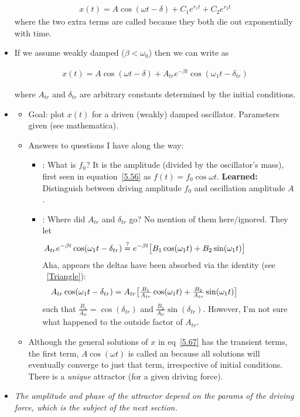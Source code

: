 \documentclass[10pt, twocolumn]{article}
\DeclareRobustCommand{\mybox}[2][gray!20]{%
	\begin{tcolorbox}[   %
		breakable,
		left=0pt,
		right=0pt,
		top=-13pt,
		bottom=0pt,
		colback=#1,
		colframe=#1,
		width=0.45\dimexpr\textwidth\relax,
		enlarge left by=0mm,
		boxsep=1pt,
		arc=0pt,outer arc=0pt,
		]
		#2
	\end{tcolorbox}
}
\begin{document}
\begin{itemize}
\begin{align}
		x(t) = A\cos(\omega t - \delta) + C_1 e^{r_1 t} + C_2 e^{r_2 t}
	\label{5.67}
	\end{align}
	where the two extra terms are called  because they both die out exponentially with time.
	\item If we assume weakly damped ($\beta < \omega_0$) then we can write as \mybox[gray!20]{
		\begin{align} \tag{5.68}
			x(t) = A\cos(\omega t - \delta) + A_{tr} e^{-\beta t} \cos(\omega_1 t - \delta_{tr})
		\label{5.68}
		\end{align}}
	where $A_{tr}$ and $\delta_{tr}$ are arbitrary constants determined by the initial conditions. 
	\item {}
	\begin{footnotesize}
		\begin{itemize}
			\item Goal: plot $x(t)$ for a driven (weakly) damped oscillator. Parameters given (see mathematica). 
			\item Answers to questions I have along the way:
			\begin{itemize}
				\item {}: What is $f_0$?  It is the amplitude (divided by the oscillator's mass), first seen in equation~\ref{5.56} as $f(t) = f_0 \cos{\omega t}$. \textbf{Learned:} Distinguish between driving amplitude $f_0$ and oscillation amplitude $A$. 
				\item {}: Where did $A_{tr}$ and $\delta_{tr}$ go? No mention of them here/ignored. They let
				\begin{align}
				\hspace*{-14ex} A_{tr} e^{-\beta t} \cos(\omega_1 t - \delta_{tr}) \stackrel{?}{=}  e^{-\beta t} \big[B_1 \cos(\omega_1 t) + B_2 \sin(\omega_1 t) \big]
				\end{align}
				 Aha, appears the deltas have been absorbed via the identity (see ~\ref{Triangle}):
				\begin{align}
				\hspace*{-14ex} A_{tr} \cos(\omega_1 t - \delta_{tr}) =  A_{tr} \big[\tfrac{B_1}{A_{tr}} \cos(\omega_1 t) + \tfrac{B_2}{A_{tr}}\sin(\omega_1 t) \big]
				\end{align}
				such that $\tfrac{B_1}{A_{tr}} = \cos(\delta_{tr})$ and $\tfrac{B_2}{A_{tr}}\sin(\delta_{tr})$. However, I'm not sure what happened to the outside factor of $A_{tr}$.
			\end{itemize}
			\item Although the general solutions of $x$ in eq~\ref{5.67} has the transient terms, the first term, $A\cos(\omega t)$ is called an  because all solutions will eventually converge to just that term, irrespective of initial conditions. There is a \textit{unique} attractor (for a given driving force). 
		\end{itemize}
	\end{footnotesize}
	\item \textit{The amplitude and phase of the attractor depend on the params of the driving force, which is the subject of the next section.}
\end{itemize}
\end{document}
